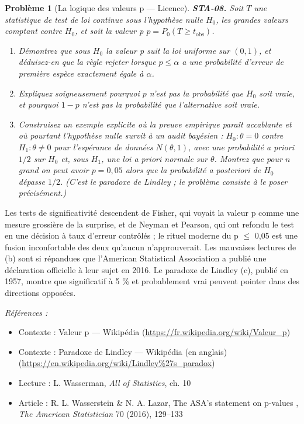 \documentclass[11pt]{article}
\newtheorem{problem}{Problème}
\newenvironment{refs}{\par\small\noindent\emph{Références :}\begin{itemize}\setlength\itemsep{0pt}}{\end{itemize}\normalsize}
\begin{document}
\bigskip

\begin{problem}[{La logique des valeurs p --- Licence}]
\textbf{STA-08.} Soit $ T $ une statistique de test de loi continue sous l'hypothèse nulle
$ H_0 $, les grandes valeurs comptant contre $ H_0 $, et soit la valeur p
$ p = P_0(T \ge t_{\mathrm{obs}}) $.
\begin{enumerate}
\item[(a)] Démontrez que sous $ H_0 $ la valeur p suit la loi uniforme sur $ (0,1) $, et déduisez-en
que la règle \og{} rejeter lorsque $ p \le \alpha $ \fg{} a une probabilité d'erreur de première espèce
exactement égale à $ \alpha $.
\item[(b)] Expliquez soigneusement pourquoi $ p $ n'est pas la probabilité que $ H_0 $ soit vraie, et
pourquoi $ 1 - p $ n'est pas la probabilité que l'alternative soit vraie.
\item[(c)] Construisez un exemple explicite où la preuve empirique paraît accablante et où pourtant
l'hypothèse nulle survit à un audit bayésien : $ H_0\colon \theta = 0 $ contre
$ H_1\colon \theta \ne 0 $ pour l'espérance de données $ N(\theta, 1) $, avec une probabilité a
priori $ 1/2 $ sur $ H_0 $ et, sous $ H_1 $, une loi a priori normale sur $ \theta $.
Montrez que pour $ n $ grand on peut avoir $ p = 0{,}05 $ alors que la probabilité a posteriori
de $ H_0 $ dépasse $ 1/2 $. (C'est le paradoxe de Lindley ; le problème consiste à le poser
précisément.)
\end{enumerate}

\end{problem}

\noindent Les tests de significativité descendent de Fisher, qui voyait la valeur p comme
une mesure grossière de la surprise, et de Neyman et Pearson, qui ont refondu le test en une
décision à taux d'erreur contrôlés ; le rituel moderne du p $\le$ 0,05 est une fusion inconfortable des
deux qu'aucun n'approuverait. Les mauvaises lectures de (b) sont si répandues que l'American
Statistical Association a publié une déclaration officielle à leur sujet en 2016. Le paradoxe de
Lindley (c), publié en 1957, montre que \og{} significatif à 5 \% \fg{} et \og{} probablement vrai \fg{} peuvent
pointer dans des directions opposées.

\begin{refs}
\item Contexte : Valeur p --- Wikipédia (\url{https://fr.wikipedia.org/wiki/Valeur_p})
\item Contexte : Paradoxe de Lindley --- Wikipédia (en anglais) (\url{https://en.wikipedia.org/wiki/Lindley%27s_paradox})
\item Lecture : L. Wasserman, \textit{All of Statistics}, ch. 10
\item Article : R. L. Wasserstein \& N. A. Lazar, \og{} The ASA's statement on p-values \fg{}, \textit{The American Statistician} 70 (2016), 129--133
\end{refs}
\end{document}
